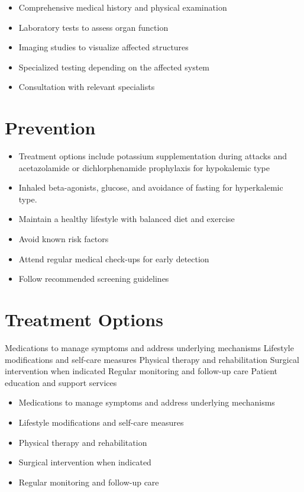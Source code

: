 \begin{itemize}[noitemsep]
  \item Comprehensive medical history and physical examination
  \item Laboratory tests to assess organ function
  \item Imaging studies to visualize affected structures
  \item Specialized testing depending on the affected system
  \item Consultation with relevant specialists
\end{itemize}
\section{Prevention}
\begin{itemize}[noitemsep]
  \item Treatment options include potassium supplementation during attacks and acetazolamide or dichlorphenamide prophylaxis for hypokalemic type
  \item Inhaled beta-agonists, glucose, and avoidance of fasting for hyperkalemic type.
  \item Maintain a healthy lifestyle with balanced diet and exercise
  \item Avoid known risk factors
  \item Attend regular medical check-ups for early detection
  \item Follow recommended screening guidelines
\end{itemize}
\section{Treatment Options}
Medications to manage symptoms and address underlying mechanisms Lifestyle modifications and self-care measures Physical therapy and rehabilitation Surgical intervention when indicated Regular monitoring and follow-up care Patient education and support services

\begin{itemize}[noitemsep]
  \item Medications to manage symptoms and address underlying mechanisms
  \item Lifestyle modifications and self-care measures
  \item Physical therapy and rehabilitation
  \item Surgical intervention when indicated
  \item Regular monitoring and follow-up care
\end{itemize}
